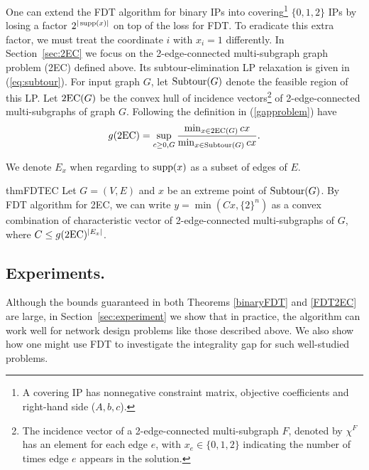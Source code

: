 One can extend the FDT algorithm for binary IPs into covering\footnote{A covering IP has nonnegative constraint matrix, objective coefficients and right-hand side ($A,b,c$).} $\{0,1,2\}$ IPs by losing a factor $2^{|\operatorname{supp}(x)|}$ on top of the loss for FDT. To eradicate this extra factor, we must treat the coordinate $i$ with $x_i=1$ differently. In Section~\ref{sec:2EC} we focus on the 2-edge-connected multi-subgraph graph problem (2EC) defined above.  Its subtour-elimination LP relaxation is given in (\ref{eq:subtour}).
For input graph $G$, let $\operatorname{{Subtour}}(G)$ denote the feasible region of this LP. Let $\2ec(G)$ be the convex hull of incidence vectors\footnote{The incidence vector of a 2-edge-connected multi-subgraph $F$, denoted by $\chi^F$ has an element for each edge $e$, with $x_e \in \{0,1,2\}$ indicating the number of times edge $e$ appears in the solution.} of 2-edge-connected multi-subgraphs of graph $G$. Following the definition in (\ref{gapproblem}) have
\begin{equation}
g(\2ec) = \sup_{c\geq 0 , G}\frac{\min_{x\in \2ec(G)} cx}{\min_{x\in \subtour(G)} cx}.
\end{equation}

We denote $E_x$ when regarding to $\operatorname{supp}(x)$ as a subset of edges of $E$.

\begin{restatable}{thm}{FDTEC}
	\label{FDT2EC}
	Let $G=(V,E)$ and $x$ be an extreme point of  $\operatorname{{Subtour}}(G)$. By FDT algorithm for 2EC, we can write $y= \min(Cx,\{2\}^n)$ as a convex combination of characteristic vector of 2-edge-connected multi-subgraphs of $G$, where $C\leq g(\2ec)^{|E_x|}$.
\end{restatable}

\subsection{Experiments.} Although the bounds guaranteed in both Theorems \ref{binaryFDT} and \ref{FDT2EC} are large, in Section~\ref{sec:experiment} we show that in practice, the algorithm can work well for network design problems like those described above. We also show how one might use FDT to investigate the integrality gap for such well-studied problems.




